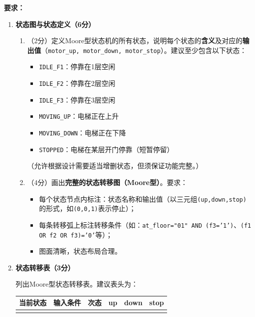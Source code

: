 \textbf{要求：}
\begin{enumerate}[label=(\arabic*)]
  \item \textbf{状态图与状态定义（6分）}
  \begin{enumerate}
    \item （2分）定义Moore型状态机的所有状态，说明每个状态的\textbf{含义}及对应的\textbf{输出值}（\texttt{motor\_up, motor\_down, motor\_stop}）。建议至少包含以下状态：
    \begin{itemize}
      \item \texttt{IDLE\_F1}：停靠在1层空闲
      \item \texttt{IDLE\_F2}：停靠在2层空闲
      \item \texttt{IDLE\_F3}：停靠在3层空闲
      \item \texttt{MOVING\_UP}：电梯正在上升
      \item \texttt{MOVING\_DOWN}：电梯正在下降
      \item \texttt{STOPPED}：电梯在某层开门停靠（短暂停留）
    \end{itemize}
    （允许根据设计需要适当增删状态，但须保证功能完整。）

    \item （4分）画出\textbf{完整的状态转移图（Moore型）}。要求：
    \begin{itemize}
      \item 每个状态节点内标注：状态名称和输出值（以三元组\texttt{(up,down,stop)}的形式，如\texttt{(0,0,1)}表示停止）；
      \item 每条转移弧上标注转移条件（如：\texttt{at\_floor="01" AND (f3='1')}、\texttt{(f1 OR f2 OR f3)='0'}等）；
      \item 图面清晰，状态布局合理。
    \end{itemize}
  \end{enumerate}

  \item \textbf{状态转移表（3分）}

  列出Moore型状态转移表。建议表头为：

  {\centering
  \begin{tabular}{|c|c|c|c|c|}
  \hline
  当前状态 & 输入条件 & 次态 & up & down & stop \\
  \hline
  \hspace{2cm} & \hspace{2.5cm} & \hspace{1.5cm} & & & \\
  \hline
  \end{tabular}
  \par}


\end{enumerate}
